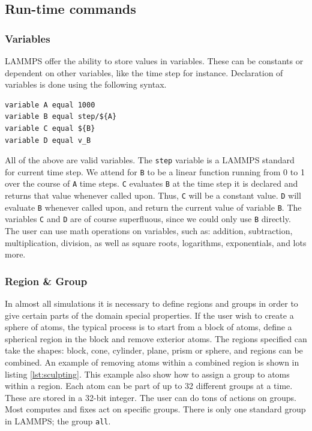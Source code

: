 \documentclass[twoside,english]{uiofysmaster}
\begin{document}
\subsection{Run-time commands}  \label{sec:run-timeCommands}
\subsubsection{Variables}
LAMMPS offer the ability to store values in variables. These can be constants or dependent on other variables, like the time step for instance. Declaration of variables is done using the following syntax.
\begin{lstlisting}[language=LammpsInput, caption={Declaration of variables.}, label={lammpsVariable}]
variable A equal 1000
variable B equal step/${A}
variable C equal ${B}
variable D equal v_B
\end{lstlisting} 
All of the above are valid variables. 
The \texttt{step} variable is a LAMMPS standard for current time step.
We attend for \texttt{B} to be a linear function running from 0 to 1 over the course of \texttt{A} time steps. 
\texttt{C} evaluates \texttt{B} at the time step it is declared and returns that value whenever called upon. 
Thus, \texttt{C} will be a constant value.
\texttt{D} will evaluate \texttt{B} whenever called upon, and return the current value of variable \texttt{B}. 
The variables \texttt{C} and \texttt{D} are of course superfluous, since we could only use \texttt{B} directly.
The user can use math operations on variables, such as: addition, subtraction, multiplication, division, as well as square roots, logarithms, exponentials, and lots more.


\subsubsection{Region \& Group}
In almost all simulations it is necessary to define regions and groups in order to give certain parts of the domain special properties. 
If the user wish to create a sphere of atoms, the typical process is to start from a block of atoms, define a spherical region in the block and remove exterior atoms. 
The regions specified can take the shapes: block, cone, cylinder, plane, prism or sphere, and regions can be combined.
An example of removing atoms within a combined region is shown in listing \ref{lst:sculpting}. 
This example also show how to assign a group to atoms within a region. 
Each atom can be part of up to 32 different groups at a time. 
These are stored in a 32-bit integer. 
The user can do tons of actions on groups. 
Most computes and fixes act on specific groups. 
There is only one standard group in LAMMPS; the group \texttt{all}.
\end{document}
